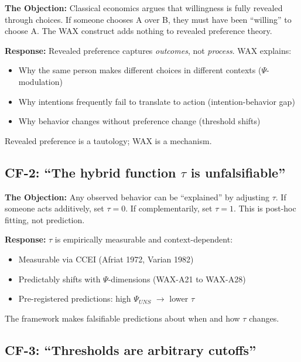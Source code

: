 \textbf{The Objection:} Classical economics argues that willingness is fully revealed through choices. If someone chooses A over B, they must have been ``willing'' to choose A. The WAX construct adds nothing to revealed preference theory.

\textbf{Response:} Revealed preference captures \textit{outcomes}, not \textit{process}. WAX explains:
\begin{itemize}[nosep]
    \item Why the same person makes different choices in different contexts ($\Psi$-modulation)
    \item Why intentions frequently fail to translate to action (intention-behavior gap)
    \item Why behavior changes without preference change (threshold shifts)
\end{itemize}
Revealed preference is a tautology; WAX is a mechanism.

\subsection{CF-2: ``The hybrid function $\tau$ is unfalsifiable''}

\textbf{The Objection:} Any observed behavior can be ``explained'' by adjusting $\tau$. If someone acts additively, set $\tau = 0$. If complementarily, set $\tau = 1$. This is post-hoc fitting, not prediction.

\textbf{Response:} $\tau$ is empirically measurable and context-dependent:
\begin{itemize}[nosep]
    \item Measurable via CCEI (Afriat 1972, Varian 1982)
    \item Predictably shifts with $\Psi$-dimensions (WAX-A21 to WAX-A28)
    \item Pre-registered predictions: high $\Psi_{UNS}$ $\to$ lower $\tau$
\end{itemize}
The framework makes falsifiable predictions about when and how $\tau$ changes.

\subsection{CF-3: ``Thresholds are arbitrary cutoffs''}

